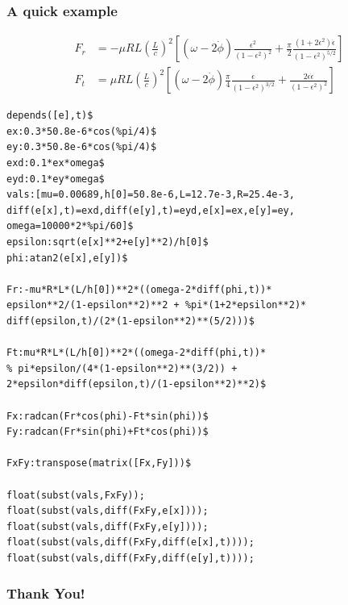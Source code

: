 \documentclass[12pt,usenames,pdftex]{beamer}
\begin{document}
\begin{frame}
  \frametitle{A quick example}
  \begin{equation*}
    \begin{split}
      F_r &= -\mu RL{\left(\frac{L}{c}\right)}^2 \left[
        (\omega-2\dot{\phi}) \frac{\epsilon^2}{{(1-\epsilon^2)}^2} +
        \frac{\pi}{2}\frac{(1+2\epsilon^2)\dot{\epsilon}}{{(1-\epsilon^2)}^{5/2}}
      \right]\\
      F_t &= \mu RL{\left(\frac{L}{c}\right)}^2 \left[ (\omega-2\dot{\phi})
        \frac{\pi}{4}\frac{\epsilon}{{(1-\epsilon^2)}^{3/2}} +
        \frac{2\epsilon\dot{\epsilon}}{{(1-\epsilon^2)}^2} \right]
    \end{split}
  \end{equation*}
  \vspace{-0.5cm}
\begin{lstlisting}[basicstyle=\small]
depends([e],t)$
ex:0.3*50.8e-6*cos(%pi/4)$
ey:0.3*50.8e-6*cos(%pi/4)$
exd:0.1*ex*omega$
eyd:0.1*ey*omega$
vals:[mu=0.00689,h[0]=50.8e-6,L=12.7e-3,R=25.4e-3,
diff(e[x],t)=exd,diff(e[y],t)=eyd,e[x]=ex,e[y]=ey,
omega=10000*2*%pi/60]$
epsilon:sqrt(e[x]**2+e[y]**2)/h[0]$
phi:atan2(e[x],e[y])$

Fr:-mu*R*L*(L/h[0])**2*((omega-2*diff(phi,t))*
epsilon**2/(1-epsilon**2)**2 + %pi*(1+2*epsilon**2)*
diff(epsilon,t)/(2*(1-epsilon**2)**(5/2)))$

Ft:mu*R*L*(L/h[0])**2*((omega-2*diff(phi,t))*
% pi*epsilon/(4*(1-epsilon**2)**(3/2)) +
2*epsilon*diff(epsilon,t)/(1-epsilon**2)**2)$ 

Fx:radcan(Fr*cos(phi)-Ft*sin(phi))$
Fy:radcan(Fr*sin(phi)+Ft*cos(phi))$

FxFy:transpose(matrix([Fx,Fy]))$

float(subst(vals,FxFy));
float(subst(vals,diff(FxFy,e[x])));
float(subst(vals,diff(FxFy,e[y])));
float(subst(vals,diff(FxFy,diff(e[x],t))));
float(subst(vals,diff(FxFy,diff(e[y],t))));

\end{lstlisting}
\end{frame}

\begin{frame}
  \frametitle{Thank You!}
\end{frame}
\end{document}
